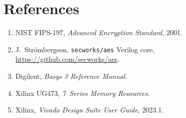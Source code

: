 \documentclass[11pt,a4paper]{article}
\begin{document}
\section*{References}
\begin{enumerate}\itemsep1pt
\item NIST FIPS-197, \textit{Advanced Encryption Standard}, 2001.
\item J.\ Str\"ombergson, \texttt{secworks/aes} Verilog core,
      \url{https://github.com/secworks/aes}.
\item Digilent, \textit{Basys 3 Reference Manual}.
\item Xilinx UG473, \textit{7~Series Memory Resources}.
\item Xilinx, \textit{Vivado Design Suite User Guide}, 2023.1.
\end{enumerate}
\end{document}
